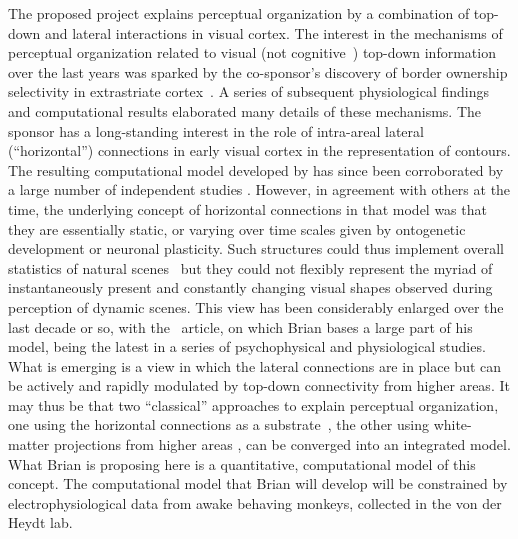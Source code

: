 \documentclass[11pt,notitlepage]{article}
\begin{document}
The proposed project explains perceptual organization by a combination
of top-down and lateral interactions in visual cortex. The interest
in the mechanisms of perceptual organization related to visual (not
cognitive~) top-down information over the last years was sparked by
the co-sponsor's discovery of border ownership selectivity in
extrastriate cortex~\citep{Zhou_etal00}. A series of subsequent
physiological findings
\citep{vonderHeydt_etal00a,vonderHeydt_etal03b,Qiu_vonderHeydt05,vonderHeydt_etal05,vonderHeydt_Pierson06,Qiu_vonderHeydt07,Qiu_etal07,OHerron_vonderHeydt09,
  Zhang_vonderHeydt10,Sugihara_etal11,OHerron_vonderHeydt13} and
computational results
\citep{Dong_etal08a,Craft_etal07,Mihalas_etal11b,Ardila_etal12,Russell_etal14}
elaborated many details of these mechanisms.  The sponsor has a
long-standing interest in the role of intra-areal lateral
(``horizontal'') connections in early visual cortex in the
representation of contours. The resulting computational model developed by
\citet{Stemmler_etal95b} has since been corroborated by a large number
of independent studies
\citep[e.g.][]{Simonotto_etal97,Polat_etal98,Chatterjee_etal11,Xie_etal14}.
However, in agreement with others at the time, the underlying concept
of horizontal connections in that model was that they are essentially static, or
varying over time scales given by ontogenetic development or neuronal
plasticity. Such structures could thus implement overall statistics of
natural scenes~\citep[like circular structures, e.g.][]{Sigman_etal01}
but they could not flexibly represent the myriad of instantaneously
present and constantly changing visual shapes observed during
perception of dynamic scenes. This view has been considerably enlarged
over the last decade or so, with the~\citet{Chen_etal14} article, on
which Brian bases a large part of his model, being the latest in a
series of psychophysical and physiological studies. What is emerging
is a view in which the lateral connections are in place but can be
actively and rapidly modulated by top-down connectivity from higher
areas. It may thus be that two ``classical'' approaches to
explain perceptual organization, one using the horizontal connections
as a substrate~\citep[e.g.][]{Zhaoping05, Piech_etal13}, the
other using white-matter projections from higher areas
\citep[e.g.][]{Craft_etal07,Mihalas_etal11b}, can be converged into an
integrated model. What Brian is proposing
here is a quantitative, computational model of this concept. 
The computational model that Brian will develop will be constrained by
electrophysiological data from awake behaving monkeys, collected in
the von der Heydt lab.
\end{document}
